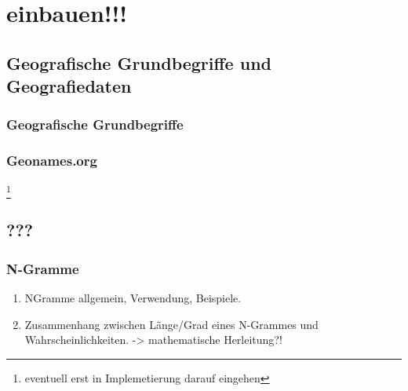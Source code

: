 \section*{einbauen!!!}
\subsection{Geografische Grundbegriffe und Geografiedaten}

		\subsubsection{Geografische Grundbegriffe}

		\subsubsection{Geonames.org} \footnote{eventuell erst in Implemetierung darauf eingehen} 
			

		\subsubsection{}	

	\subsection{???} 
		\subsubsection{N-Gramme}
			\begin{enumerate}
				\item NGramme allgemein, Verwendung, Beispiele. 
				\item {} Zusammenhang zwischen Länge/Grad eines N-Grammes und Wahrscheinlichkeiten. -> mathematische Herleitung?!
			\end{enumerate}





